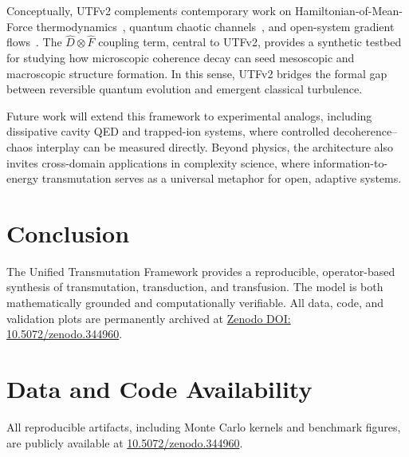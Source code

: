 \documentclass[11pt]{article}
\begin{document}
Conceptually, UTFv2 complements contemporary work on
Hamiltonian-of-Mean-Force thermodynamics~\cite{Pathania2024Quantum},
quantum chaotic channels~\cite{MatsoukasRoubeas2024Quantum},
and open-system gradient flows~\cite{PRResearchForceCurrent2023}.
The $\hat{D}\otimes\hat{F}$ coupling term, central to UTFv2, provides
a synthetic testbed for studying how microscopic coherence decay can seed
mesoscopic and macroscopic structure formation.
In this sense, UTFv2 bridges the formal gap between reversible
quantum evolution and emergent classical turbulence.

Future work will extend this framework to experimental analogs,
including dissipative cavity QED and trapped-ion systems, where
controlled decoherence–chaos interplay can be measured directly.
Beyond physics, the architecture also invites cross-domain applications
in complexity science, where information-to-energy transmutation
serves as a universal metaphor for open, adaptive systems.



\section{Conclusion}
The Unified Transmutation Framework provides a reproducible,
operator-based synthesis of transmutation, transduction, and transfusion.
The model is both mathematically grounded and computationally verifiable.
All data, code, and validation plots are permanently archived at
\href{https://doi.org/10.5072/zenodo.344960}{Zenodo DOI: 10.5072/zenodo.344960}.

\section*{Data and Code Availability}
All reproducible artifacts, including Monte Carlo kernels and benchmark figures,
are publicly available at
\href{https://doi.org/10.5072/zenodo.344960}{10.5072/zenodo.344960}.




\end{document}
